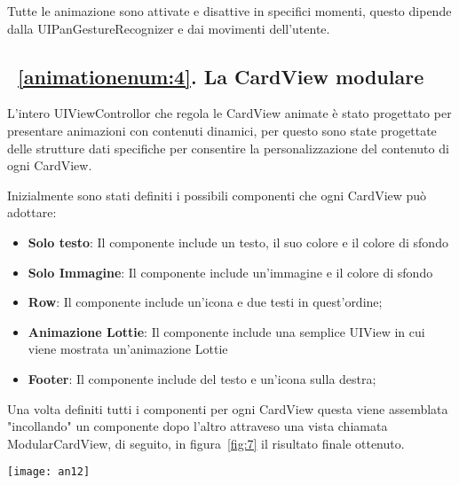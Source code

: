 Tutte le animazione sono attivate e disattive in specifici momenti, questo dipende 
dalla UIPanGestureRecognizer e dai movimenti dell'utente.

\subsection{~\ref{animationenum:4}. La CardView modulare}

L'intero UIViewControllor che regola le CardView animate è stato progettato per presentare 
animazioni con contenuti dinamici, per questo sono state progettate delle strutture dati specifiche per consentire la personalizzazione
del contenuto di ogni CardView. 

Inizialmente sono stati definiti i possibili componenti che ogni CardView può adottare:
\begin{itemize}
    \item\textbf{Solo testo}: Il componente include un testo, il suo colore e il colore di sfondo
    \item\textbf{Solo Immagine}: Il componente include un'immagine e il colore di sfondo
    \item\textbf{Row}: Il componente include un'icona e due testi in quest'ordine;
    \item\textbf{Animazione Lottie\cite{lottie}}: Il componente include una semplice UIView in cui viene mostrata un'animazione Lottie
    \item\textbf{Footer}: Il componente include del testo e un'icona sulla destra;
\end{itemize}

Una volta definiti tutti i componenti per ogni CardView questa viene assemblata "incollando" un componente
dopo l'altro attraveso una vista chiamata ModularCardView, di seguito, in figura~\ref{fig:7} il risultato finale ottenuto. \\

\begin{minipage}{\linewidth}
    \centering
    \texttt{[image: an12]}
    \label{fig:7}
\end{minipage}\\


